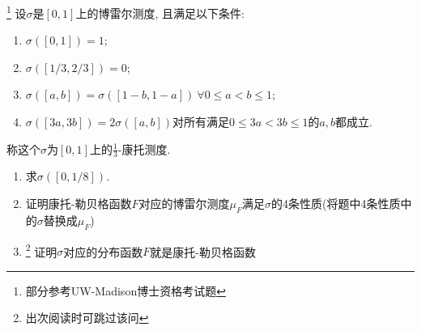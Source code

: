 \begin{example}\label{Cantor_measure}\footnote{部分参考UW-Madison博士资格考试题}
    设$\sigma$是$[0,1]$上的博雷尔测度, 且满足以下条件:
    \begin{enumerate}
    \item $\sigma([0,1]) = 1$;
    \item $\sigma([1/3, 2/3]) = 0$;
    \item $\sigma([a,b]) = \sigma([1-b,1-a])~\forall 0 \leq a < b \leq 1$;
    \item $\sigma([3a, 3b]) = 2\sigma([a,b])$对所有满足$0 \leq 3a < 3b \leq 1$的$a,b$都成立. 
    \end{enumerate}
    称这个$\sigma$为$[0,1]$上的$\frac{1}{3}$-康托测度. 
    \begin{enumerate}
        \item 求$\sigma([0, 1/8])$.
        \item 证明康托-勒贝格函数$F$对应的博雷尔测度$\mu_F$满足$\sigma$的4条性质(将题中4条性质中的$\sigma$替换成$\mu_F$)
        \item\footnote{出次阅读时可跳过该问} 证明$\sigma$对应的分布函数$F$就是康托-勒贝格函数
    \end{enumerate}
\end{example}
